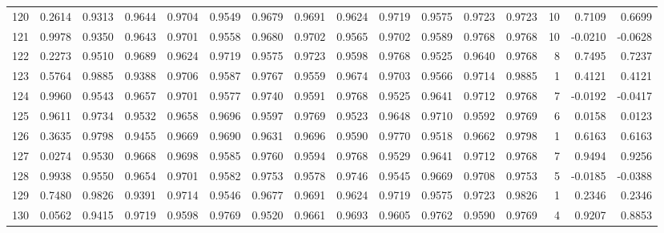 \begin{tabular}{lrrrrrrrrrrrrrrr}
120 &      0.2614 &  0.9313 &  0.9644 &  0.9704 &  0.9549 &  0.9679 &  0.9691 &  0.9624 &  0.9719 &  0.9575 &   0.9723 &     0.9723 &     10 &                    0.7109 &                     0.6699 \\
121 &      0.9978 &  0.9350 &  0.9643 &  0.9701 &  0.9558 &  0.9680 &  0.9702 &  0.9565 &  0.9702 &  0.9589 &   0.9768 &     0.9768 &     10 &                   -0.0210 &                    -0.0628 \\
122 &      0.2273 &  0.9510 &  0.9689 &  0.9624 &  0.9719 &  0.9575 &  0.9723 &  0.9598 &  0.9768 &  0.9525 &   0.9640 &     0.9768 &      8 &                    0.7495 &                     0.7237 \\
123 &      0.5764 &  0.9885 &  0.9388 &  0.9706 &  0.9587 &  0.9767 &  0.9559 &  0.9674 &  0.9703 &  0.9566 &   0.9714 &     0.9885 &      1 &                    0.4121 &                     0.4121 \\
124 &      0.9960 &  0.9543 &  0.9657 &  0.9701 &  0.9577 &  0.9740 &  0.9591 &  0.9768 &  0.9525 &  0.9641 &   0.9712 &     0.9768 &      7 &                   -0.0192 &                    -0.0417 \\
125 &      0.9611 &  0.9734 &  0.9532 &  0.9658 &  0.9696 &  0.9597 &  0.9769 &  0.9523 &  0.9648 &  0.9710 &   0.9592 &     0.9769 &      6 &                    0.0158 &                     0.0123 \\
126 &      0.3635 &  0.9798 &  0.9455 &  0.9669 &  0.9690 &  0.9631 &  0.9696 &  0.9590 &  0.9770 &  0.9518 &   0.9662 &     0.9798 &      1 &                    0.6163 &                     0.6163 \\
127 &      0.0274 &  0.9530 &  0.9668 &  0.9698 &  0.9585 &  0.9760 &  0.9594 &  0.9768 &  0.9529 &  0.9641 &   0.9712 &     0.9768 &      7 &                    0.9494 &                     0.9256 \\
128 &      0.9938 &  0.9550 &  0.9654 &  0.9701 &  0.9582 &  0.9753 &  0.9578 &  0.9746 &  0.9545 &  0.9669 &   0.9708 &     0.9753 &      5 &                   -0.0185 &                    -0.0388 \\
129 &      0.7480 &  0.9826 &  0.9391 &  0.9714 &  0.9546 &  0.9677 &  0.9691 &  0.9624 &  0.9719 &  0.9575 &   0.9723 &     0.9826 &      1 &                    0.2346 &                     0.2346 \\
130 &      0.0562 &  0.9415 &  0.9719 &  0.9598 &  0.9769 &  0.9520 &  0.9661 &  0.9693 &  0.9605 &  0.9762 &   0.9590 &     0.9769 &      4 &                    0.9207 &                     0.8853 \\

\end{tabular}
